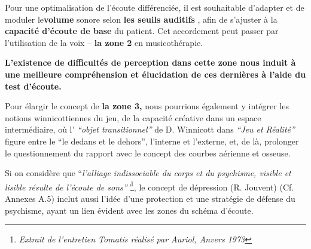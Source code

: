                             Pour une optimalisation de l'écoute différenciée, il est souhaitable d'adapter et de moduler le\textbf{volume } sonore selon \textbf{ les seuils auditifs }, afin de s'ajuster à la \textbf{ capacité
                            d'écoute de base} du patient. Cet accordement peut passer par l'utilisation de la voix -- \textbf{ la zone 2} en musicothérapie.

                            \textbf{L'existence de difficultés de perception dans cette zone nous
                            induit à une meilleure compréhension et  élucidation de ces dernières à l'aide du
                            test d'écoute.}

                            Pour élargir le concept de \textbf{la zone 3,} nous pourrions
                            également y intégrer les notions winnicottiennes du jeu, de la capacité
                            créative dans un espace
                            intermédiaire, où l' \textit{``objet
                            transitionnel'' } de D. Winnicott dans \textit{``Jeu et Réalité''}
                            \autocite{winnicott}
                            figure entre le ``le
                            dedans et le
                            dehors'',
                            l'interne et l'externe, et, de là, prolonger le questionnement du
                            rapport avec le concept des
                            courbes aérienne et osseuse.



                            Si on considère que ``\emph{l'alliage indissociable du corps et du psychisme,
                            visible et lisible résulte de l'écoute de
                            sons'''}\footnote{\emph{Extrait de l'entretien Tomatis réalisé par
                              Auriol, Anvers 1973}}, le concept de dépression (R. Jouvent) \autocite{doronparot} (Cf. Annexes
                            A.5) inclut aussi l'idée d'une protection et une stratégie de
                            défense du psychisme, ayant un lien évident avec les zones du schéma d'écoute.

